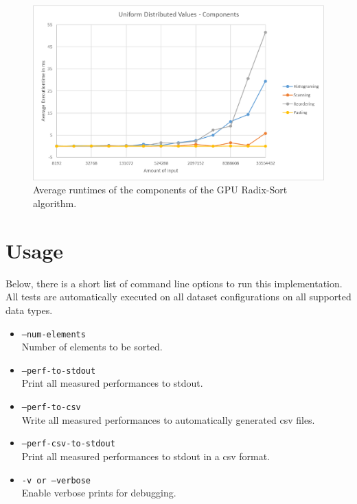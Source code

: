 \documentclass{llncs}
\begin{document}
\begin{figure}
  \begin{center}
    \includegraphics[width=\columnwidth]{charts/uniform_details.png}
  \end{center}
  \caption{Average runtimes of the components of the GPU Radix-Sort algorithm.}\label{fig:components}
\end{figure}

\section{Usage}
Below, there is a short list of command line options to run this implementation. All tests are automatically executed on all dataset configurations on all supported data types.

\begin{itemize}
  \item[] \texttt{--num-elements}\\ Number of elements to be sorted.
  \item[] \texttt{--perf-to-stdout}\\ Print all measured performances to stdout.
  \item[] \texttt{--perf-to-csv}\\ Write all measured performances to automatically generated csv files.
  \item[] \texttt{--perf-csv-to-stdout}\\ Print all measured performances to stdout in a csv format.
  \item[] \texttt{-v or --verbose}\\ Enable verbose prints for debugging.
\end{itemize}



\end{document}
